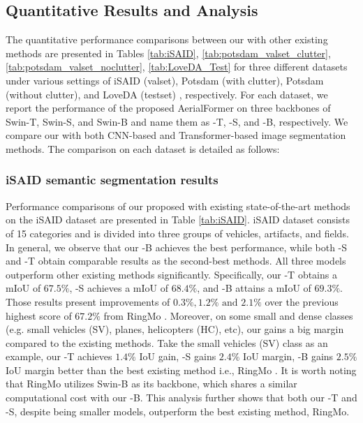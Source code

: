 \documentclass[journal]{IEEEtran}
\begin{document}
\subsection{Quantitative Results and Analysis}
The quantitative performance comparisons between our \model with other existing methods are presented in Tables \ref{tab:iSAID}, \ref{tab:potsdam_valset_clutter}, \ref{tab:potsdam_valset_noclutter}, \ref{tab:LoveDA_Test}
for three different datasets under various settings of iSAID (valset), Potsdam (with clutter), Potsdam (without clutter), and LoveDA (testset)
, respectively. For each dataset, we report the performance of the proposed AerialFormer on three backbones of Swin-T, Swin-S, and Swin-B and name them as \model-T, \model-S, and \model-B, respectively. We compare our \model with both CNN-based and Transformer-based image segmentation methods. The comparison on each dataset is detailed as follows:

\subsubsection{\textbf{iSAID semantic segmentation results}}
\label{sec:iSAID_results}
Performance comparisons of our proposed \model with existing state-of-the-art methods on the iSAID dataset are presented in Table \ref{tab:iSAID}. iSAID dataset consists of 15 categories and is divided into three groups of vehicles, artifacts, and fields. In general, we observe that our \model-B achieves the best performance, while both \model-S and \model-T obtain comparable results as the second-best methods. All three models outperform other existing methods significantly. Specifically, our \model-T obtains a mIoU of  $67.5\%$, \model-S achieves a mIoU of  $68.4\%$, and \model-B attains a mIoU of $69.3\%$. Those results present improvements of $0.3\%, 1.2\% \text{ and }2.1\%$  over the previous highest score of $67.2\%$ from RingMo \cite{sun2022ringmo}. Moreover, on some small and dense classes (e.g. small vehicles (SV), planes, helicopters (HC), etc), our \model gains a big margin compared to the existing methods. Take the small vehicles (SV) class as an example, our \model-T achieves $1.4\%$ IoU gain, \model-S gains $2.4\%$ IoU margin, \model-B gains $2.5\%$ IoU margin better than the best existing method i.e., RingMo \cite{sun2022ringmo}. It is worth noting that RingMo utilizes Swin-B as its backbone, which shares a similar computational cost with our \model-B. This analysis further shows that both our \model-T and \model-S, despite being smaller models, outperform the best existing method, RingMo.
\end{document}
